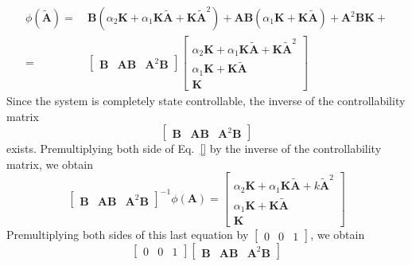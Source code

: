 \documentclass[12pt,a4paper,oneside]{book}
\begin{document}
\begin{onehalfspace}
\begin{equation} \label{ackermann_6}
	\begin{split}
		\phi(\tilde{\mathbf{A}}) = & \:\mathbf{B}(\alpha_2\mathbf{K}+\alpha_1\mathbf{K}\tilde{\mathbf{A}}+\mathbf{K}\tilde{\mathbf{A}}^2)+\mathbf{AB}(\alpha_1\mathbf{K}+\mathbf{K}\tilde{\mathbf{A}})+\mathbf{A}^2\mathbf{BK}+\\
		= & \: 	
		\begin{bmatrix}
			\mathbf{B} & \mathbf{AB} & \mathbf{A}^2\mathbf{B}
		\end{bmatrix}
		\begin{bmatrix}
			\alpha_2\mathbf{K}+\alpha_1\mathbf{K}\tilde{\mathbf{A}}+\mathbf{K}\tilde{\mathbf{A}}^2 \\ 
			\alpha_1\mathbf{K}+\mathbf{K}\tilde{\mathbf{A}} \\
			\mathbf{K}
		\end{bmatrix}
	\end{split}
\end{equation}
Since the system is completely state controllable, the inverse of the controllability matrix
\begin{equation}
	\begin{bmatrix}
		\mathbf{B} & \mathbf{AB} & \mathbf{A}^2\mathbf{B}
	\end{bmatrix}
\end{equation}
exists. Premultiplying both side of Eq.~\eqref{} by the inverse of the 
controllability matrix, we obtain
\begin{equation}
	\begin{bmatrix}
		\mathbf{B} & \mathbf{AB} & \mathbf{A}^2\mathbf{B}
	\end{bmatrix}^{-1} \phi(\mathbf{A})=
	\begin{bmatrix}
		\alpha_2\mathbf{K}+\alpha_1\mathbf{K}\tilde{\mathbf{A}}+k\tilde{\mathbf{A}}^2 \\ 
		\alpha_1\mathbf{K}+\mathbf{K}\tilde{\mathbf{A}} \\
		\mathbf{K}
	\end{bmatrix}
\end{equation}
Premultiplying both sides of this last equation by $\begin{bmatrix} 0&0&1\end{bmatrix}$, we obtain 
\begin{equation}
	\begin{bmatrix} 
		0&0&1
	\end{bmatrix}
	\begin{bmatrix}
		\mathbf{B} & \mathbf{AB} & \mathbf{A}^2\mathbf{B}

\end{bmatrix}
\end{equation}
\end{onehalfspace}
\end{document}
